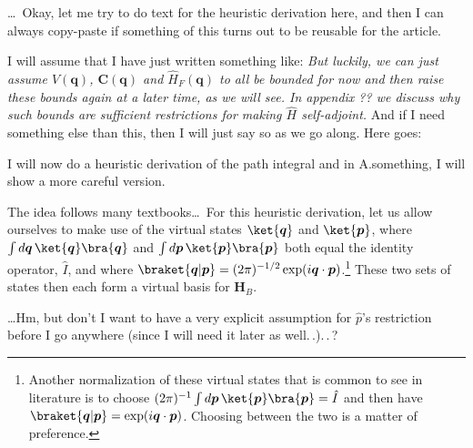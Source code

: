 \documentclass{report}
\begin{document}
\ldots\ Okay, let me try to do text for the heuristic derivation here, and then I can always copy-paste if something of this turns out to be reusable for the article.

I will assume that I have just written something like: 
\textit{But luckily, we can just assume $V(\boldsymbol{q})$, $\boldsymbol{C}(\boldsymbol{q})$ and $\hat H_F(\boldsymbol{q})$ to all be bounded for now and then raise these bounds again at a later time, as we will see. In appendix ?? we discuss why such bounds are sufficient restrictions for making $\hat H$ self-adjoint.}
\noindent And if I need something else than this, then I will just say so as we go along. Here goes:

I will now do a heuristic derivation of the path integral and in A.something, I will show a more careful version.

The idea follows many %
textbooks\ldots\ For this heuristic derivation, let us allow ourselves to make use of the virtual states $\ket{\boldsymbol{q}}$ and $\ket{\boldsymbol{p}}$, where 
$\int d\boldsymbol{q}\, \ket{\boldsymbol{q}}\bra{\boldsymbol{q}}$ and 
$\int d\boldsymbol{p}\, \ket{\boldsymbol{p}}\bra{\boldsymbol{p}}$ both equal the identity operator, $\hat I$, 
and where $\braket{\boldsymbol{q} | \boldsymbol{p}} = (2\pi)^{-1/2} \exp(i \boldsymbol{q} \cdot \boldsymbol{p})$.\footnote{
	Another normalization of these virtual states that is common to see in literature is to choose $(2\pi)^{-1} \int d\boldsymbol{p}\, \ket{\boldsymbol{p}}\bra{\boldsymbol{p}} = \hat I$ and then have $\braket{\boldsymbol{q} | \boldsymbol{p}} = \exp(i \boldsymbol{q} \cdot \boldsymbol{p})$. Choosing between the two is a matter of preference. %
}
These two sets of states then each form a virtual basis for $\textbf{H}_B$. 

\ldots Hm, but don't I want to have a very explicit assumption for $\hat p$'s restriction before I go anywhere (since I will need it later as well.\,.).\,.\,? 
\end{document}
